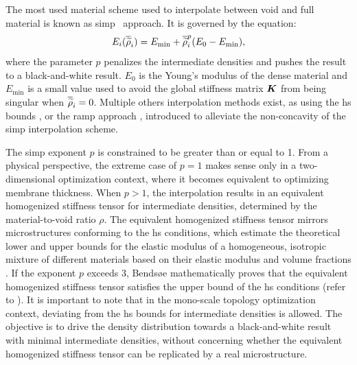 The most used material scheme used to interpolate between void and full material is known as \gls{simp}~ approach. It is governed by the equation:
\begin{equation}
    E_i(\overline{\widetilde{\rho}}_i) = E_{\textrm{min}} + \overline{\widetilde{\rho}}_i^p(E_0-E_{\textrm{min}}),
    \label{eq:02_simp}
\end{equation}
where the parameter $p$ penalizes the intermediate densities and pushes the result to a black-and-white result. $E_0$ is the Young's modulus of the dense material and $E_{\textrm{min}}$ is a small value used to avoid the global stiffness matrix $\bm{K}$ from being singular when $\overline{\widetilde{\rho}}_i=0$. Multiple others interpolation methods exist, as using the \gls{hs} bounds \cite{bendsoe_material_1999}, or the \gls{ramp} approach , introduced to alleviate the non-concavity of the \gls{simp} interpolation scheme. 

The \gls{simp} exponent $p$ is constrained to be greater than or equal to 1. From a physical perspective, the extreme case of $p = 1$ makes sense only in a two-dimensional optimization context, where it becomes equivalent to optimizing membrane thickness. When $p > 1$, the interpolation results in an equivalent homogenized stiffness tensor for intermediate densities, determined by the material-to-void ratio $\rho$. The equivalent homogenized stiffness tensor mirrors microstructures conforming to the \gls{hs} conditions, which estimate the theoretical lower and upper bounds for the elastic modulus of a homogeneous, isotropic mixture of different materials based on their elastic modulus and volume fractions . If the exponent $p$ exceeds 3, Bendsøe  mathematically proves that the equivalent homogenized stiffness tensor satisfies the upper bound of the \gls{hs} conditions (refer to ). It is important to note that in the mono-scale topology optimization context, deviating from the \gls{hs} bounds for intermediate densities is allowed. The objective is to drive the density distribution towards a black-and-white result with minimal intermediate densities, without concerning whether the equivalent homogenized stiffness tensor can be replicated by a real microstructure.

